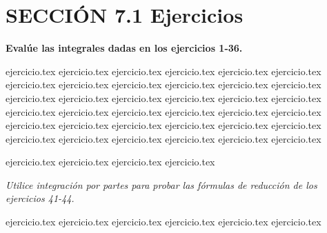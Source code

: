 
\section*{SECCIÓN 7.1 \quad Ejercicios}

\noindent\textbf{Evalúe las integrales dadas en los ejercicios 1-36.}
\begin{enumerate}
    {ejercicio.tex}
{ejercicio.tex}
{ejercicio.tex}
{ejercicio.tex}
{ejercicio.tex}
{ejercicio.tex}
{ejercicio.tex}
{ejercicio.tex}
{ejercicio.tex}
{ejercicio.tex}
{ejercicio.tex}
{ejercicio.tex}
{ejercicio.tex}
{ejercicio.tex}
{ejercicio.tex}
{ejercicio.tex}
{ejercicio.tex}
{ejercicio.tex}
{ejercicio.tex}
{ejercicio.tex}
{ejercicio.tex}
{ejercicio.tex}
{ejercicio.tex}
{ejercicio.tex}
{ejercicio.tex}
{ejercicio.tex}
{ejercicio.tex}
{ejercicio.tex}
{ejercicio.tex}
{ejercicio.tex}
{ejercicio.tex}
{ejercicio.tex}
{ejercicio.tex}
{ejercicio.tex}
{ejercicio.tex}
{ejercicio.tex}
\end{enumerate}

\vspace{0.5cm}
\begin{enumerate}
    \setcounter{enumi}{36}
    {ejercicio.tex}
{ejercicio.tex}
{ejercicio.tex}
{ejercicio.tex}
\end{enumerate}

\vspace{0.5cm}
\noindent\textit{Utilice integración por partes para probar las fórmulas de reducción de los ejercicios 41-44.}
\begin{enumerate}
    \setcounter{enumi}{40}
    {ejercicio.tex}
{ejercicio.tex}
{ejercicio.tex}
{ejercicio.tex}
{ejercicio.tex}
{ejercicio.tex}
\end{enumerate}

